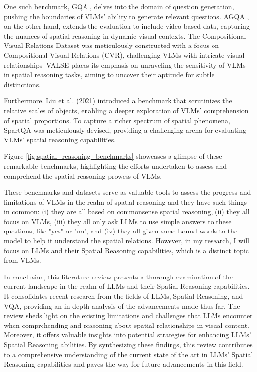 \documentclass[journal,10pt]{IEEEtran}
\begin{document}
One such benchmark, GQA \cite{hudson2019gqa}, delves into the domain of question generation, pushing the boundaries of VLMs' ability to generate relevant questions. AGQA \cite{grunde2021agqa}, on the other hand, extends the evaluation to include video-based data, capturing the nuances of spatial reasoning in dynamic visual contexts. The Compositional Visual Relations Dataset \cite{zerroug2022benchmark} was meticulously constructed with a focus on Compositional Visual Relations (CVR), challenging VLMs with intricate visual relationships. VALSE \cite{parcalabescu2021valse} places its emphasis on unraveling the sensitivity of VLMs in spatial reasoning tasks, aiming to uncover their aptitude for subtle distinctions.

Furthermore, Liu et al. (2021) introduced a benchmark \cite{liu2022things} that scrutinizes the relative scales of objects, enabling a deeper exploration of VLMs' comprehension of spatial proportions. To capture a richer spectrum of spatial phenomena, SpartQA \cite{mirzaee2021spartqa} was meticulously devised, providing a challenging arena for evaluating VLMs' spatial reasoning capabilities.

Figure \ref{fig:spatial_reasoning_benchmarks} showcases a glimpse of these remarkable benchmarks, highlighting the efforts undertaken to assess and comprehend the spatial reasoning prowess of VLMs.


These benchmarks and datasets serve as valuable tools to assess the progress and limitations of VLMs in the realm of spatial reasoning and they have such things in common: (i) they are all based on commonsense spatial reasoning, (ii) they all focus on VLMs, (iii) they all only ask LLMs to use simple answers to these questions, like "yes" or "no", and (iv) they all given some bound words to the model to help it understand the spatial relations. However, in my research, I will focus on LLMs and their Spatial Reasoning capabilities, which is a distinct topic from VLMs. 

In conclusion, this literature review presents a thorough examination of the current landscape in the realm of LLMs and their Spatial Reasoning capabilities. It consolidates recent research from the fields of LLMs, Spatial Reasoning, and VQA, providing an in-depth analysis of the advancements made thus far. The review sheds light on the existing limitations and challenges that LLMs encounter when comprehending and reasoning about spatial relationships in visual content. Moreover, it offers valuable insights into potential strategies for enhancing LLMs' Spatial Reasoning abilities. By synthesizing these findings, this review contributes to a comprehensive understanding of the current state of the art in LLMs' Spatial Reasoning capabilities and paves the way for future advancements in this field.
\end{document}
